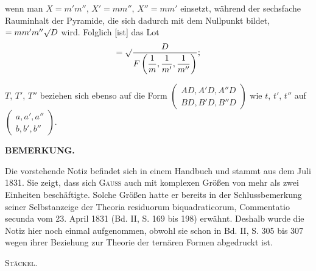 
\noindent wenn man $X = m'm''$, $X' = mm''$, $X'' = mm'$ einsetzt, während der sechsfache
Rauminhalt der Pyramide, die sich dadurch mit dem Nullpunkt bildet, $= mm'm''\mathord{\surd}D$
wird. Folglich [ist] das Lot
\[
= \mathord{\surd}\dfrac{D}{F\left(\dfrac{1}{m}, \dfrac{1}{m'}, \dfrac{1}{m''}\right)};
\]

$T$, $T'$, $T''$ beziehen sich ebenso auf die Form $\begin{pmatrix} AD, A'D, A''D \\ BD, B'D, B''D \end{pmatrix}$
wie $t$, $t'$, $t''$ auf $\begin{pmatrix} a, a', a'' \\ b, b', b'' \end{pmatrix}$.



\begin{center}
\bfseries BEMERKUNG.
\end{center}

Die vorstehende Notiz befindet sich in einem Handbuch und stammt aus dem Juli 1831. Sie
zeigt, dass sich \textsc{Gauss} auch mit komplexen Größen von mehr als zwei Einheiten beschäftigte.
Solche Größen hatte er bereits in der Schlussbemerkung seiner Selbstanzeige der Theoria residuorum
biquadraticorum, Commentatio secunda vom 23. April 1831 (Bd. II, S. 169 bis 198) erwähnt.
Deshalb wurde die Notiz hier noch einmal aufgenommen, obwohl sie schon in Bd. II, S. 305 bis
307 wegen ihrer Beziehung zur Theorie der ternären Formen abgedruckt ist.
\begin{flushright}
\textsc{Stäckel.}
\end{flushright}


